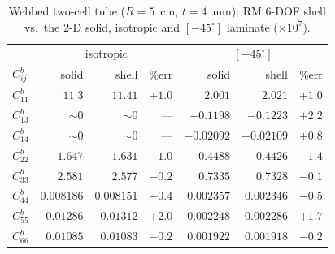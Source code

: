 \begin{table}[htpb]
\centering
\small
\caption{Webbed two-cell tube ($R=5$~cm, $t=4$~mm): RM 6-DOF shell vs.\ the 2-D solid, isotropic and $[-45^\circ]$ laminate ($\times10^{7}$).}
\label{tab:two}
\setlength{\tabcolsep}{4.5pt}
\begin{tabular}{l|rrr|rrr}
\hline
 & \multicolumn{3}{c|}{isotropic} & \multicolumn{3}{c}{$[-45^\circ]$} \\
$C^{b}_{ij}$ & solid & shell & \%err & solid & shell & \%err \\
\hline
$C^{b}_{11}$ & $11.3$ & $11.41$ & $+1.0$ & $2.001$ & $2.021$ & $+1.0$ \\
$C^{b}_{13}$ & $\sim\!0$ & $\sim\!0$ & --- & $-0.1198$ & $-0.1223$ & $+2.2$ \\
$C^{b}_{14}$ & $\sim\!0$ & $\sim\!0$ & --- & $-0.02092$ & $-0.02109$ & $+0.8$ \\
$C^{b}_{22}$ & $1.647$ & $1.631$ & $-1.0$ & $0.4488$ & $0.4426$ & $-1.4$ \\
$C^{b}_{33}$ & $2.581$ & $2.577$ & $-0.2$ & $0.7335$ & $0.7328$ & $-0.1$ \\
$C^{b}_{44}$ & $0.008186$ & $0.008151$ & $-0.4$ & $0.002357$ & $0.002346$ & $-0.5$ \\
$C^{b}_{55}$ & $0.01286$ & $0.01312$ & $+2.0$ & $0.002248$ & $0.002286$ & $+1.7$ \\
$C^{b}_{66}$ & $0.01085$ & $0.01083$ & $-0.2$ & $0.001922$ & $0.001918$ & $-0.2$ \\
\hline
\end{tabular}
\end{table}